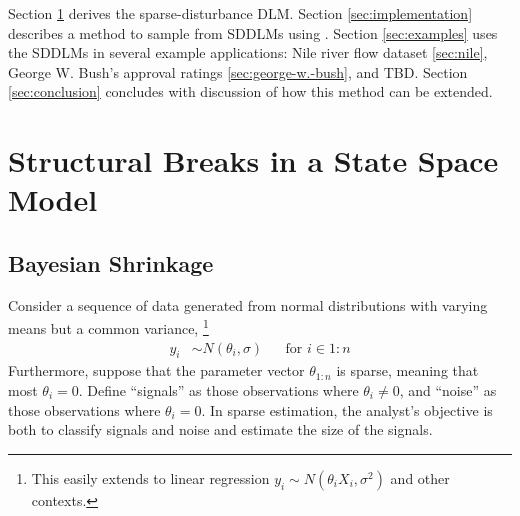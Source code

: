 \documentclass{article}
\begin{document}
Section \ref{sec:struct-breaks-state} derives the sparse-disturbance DLM.
Section \ref{sec:implementation} describes a method to sample from SDDLMs using \Stan{}.
Section \ref{sec:examples} uses the SDDLMs in several example applications: Nile river flow dataset \ref{sec:nile}, George W. Bush's approval ratings \ref{sec:george-w.-bush}, and TBD.
Section \ref{sec:conclusion} concludes with discussion of how this
method can be extended.

\section{Structural Breaks in a State Space Model}
\label{sec:struct-breaks-state}

\subsection{Bayesian Shrinkage}
\label{sec:bayesian-shrinkage}

Consider a sequence of data generated from normal distributions with varying means but a common variance,%
\footnote{
  This easily extends to linear regression $y_{i} \sim N(\theta_{i} X_{i}, \sigma^{2})$ and other contexts.
}
\begin{align}
  \label{eq:13}
  y_{i} & \sim N(\theta_{i}, \sigma) & & \text{for $i \in 1:n$}
\end{align}
Furthermore, suppose that the parameter vector $\theta_{1:n}$ is sparse, meaning that most $\theta_{i} = 0$.
Define ``signals'' as those observations where $\theta_{i} \neq 0$, and ``noise'' as those observations where $\theta_{i} = 0$.
In sparse estimation, the analyst's objective is both to classify signals and noise and estimate the size of the signals.
\end{document}
